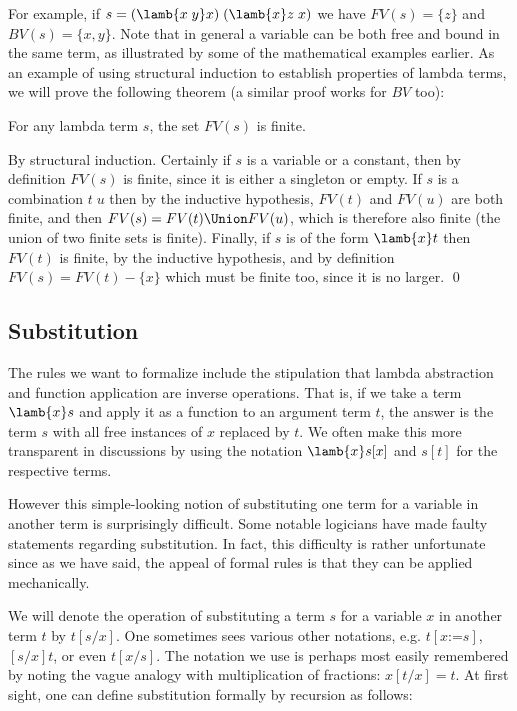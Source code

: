 For example, if $s = (\lamb{x\; y} x)\; (\lamb{x} z\; x)$ we have $FV(s) = \{ z
\}$ and $BV(s) = \{ x, y \}$. Note that in general a variable can be both free
and bound in the same term, as illustrated by some of the mathematical examples
earlier. As an example of using structural induction to establish properties of
lambda terms, we will prove the following theorem (a similar proof works for
$BV$ too):

\begin{theorem}
For any lambda term $s$, the set $FV(s)$ is finite.

\proof By structural induction. Certainly if $s$ is a variable or a constant,
then by definition $FV(s)$ is finite, since it is either a singleton or empty.
If $s$ is a combination $t\;u$ then by the inductive hypothesis, $FV(t)$ and
$FV(u)$ are both finite, and then $FV(s) = FV(t) \Union FV(u)$, which is
therefore also finite (the union of two finite sets is finite). Finally, if $s$
is of the form $\lamb{x} t$ then $FV(t)$ is finite, by the inductive
hypothesis, and by definition $FV(s) = FV(t) - \{ x \}$ which must be finite
too, since it is no larger. \qed

\end{theorem}

\subsection{Substitution}

The rules we want to formalize include the stipulation that lambda abstraction
and function application are inverse operations. That is, if we take a term
$\lamb{x} s$ and apply it as a function to an argument term $t$, the answer is
the term $s$ with all free instances of $x$ replaced by $t$. We often make this
more transparent in discussions by using the notation $\lamb{x} s[x]$ and
$s[t]$ for the respective terms.

However this simple-looking notion of substituting one term for a variable in
another term is surprisingly difficult. Some notable logicians have made faulty
statements regarding substitution. In fact, this difficulty is rather
unfortunate since as we have said, the appeal of formal rules is that they can
be applied mechanically.

We will denote the operation of substituting a term $s$ for a variable $x$ in
another term $t$ by $t[s/x]$. One sometimes sees various other notations, e.g.
$t[x \mbox{:=} s]$, $[s/x]t$, or even $t[x/s]$. The notation we use is perhaps
most easily remembered by noting the vague analogy with multiplication of
fractions: $x[t/x] = t$. At first sight, one can define substitution formally
by recursion as follows:

